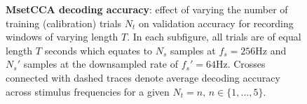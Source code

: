 \begin{figure}[htp]
\hfill
{}

\caption[MsetCCA decoding accuracy: effect of varying the number of training (calibration) trials $N_t$ on validation accuracy for recording windows of varying length $T$.]{\textbf{MsetCCA decoding accuracy}: effect of varying the number of training (calibration) trials $N_t$ on validation accuracy for recording windows of varying length $T$. In each subfigure, all trials are of equal length $T$ seconds which equates to $N_s$ samples at $f_s=256$Hz and $N_s'$ samples at the downsampled rate of $f_s'=64$Hz. Crosses connected with dashed traces denote average decoding accuracy across stimulus frequencies for a given $N_t=n, \, n\in\{1, \dots, 5\}$.}
\label{fig:mset-acc-nt}
\end{figure}

